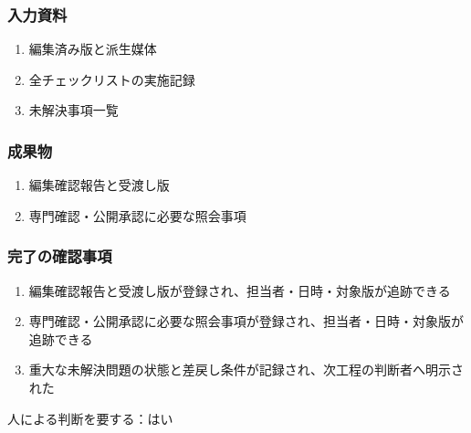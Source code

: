 \documentclass[a4paper,11pt]{article}
\begin{document}
\subsubsection*{入力資料}
\begin{enumerate}[leftmargin=2em,itemsep=0.35em]
\item 編集済み版と派生媒体
\item 全チェックリストの実施記録
\item 未解決事項一覧
\end{enumerate}
\subsubsection*{成果物}
\begin{enumerate}[leftmargin=2em,itemsep=0.35em]
\item 編集確認報告と受渡し版
\item 専門確認・公開承認に必要な照会事項
\end{enumerate}
\subsubsection*{完了の確認事項}
\begin{enumerate}[leftmargin=2em,itemsep=0.35em]
\item 編集確認報告と受渡し版が登録され、担当者・日時・対象版が追跡できる
\item 専門確認・公開承認に必要な照会事項が登録され、担当者・日時・対象版が追跡できる
\item 重大な未解決問題の状態と差戻し条件が記録され、次工程の判断者へ明示された
\end{enumerate}
\par 人による判断を要する：はい\par\medskip
\end{document}
